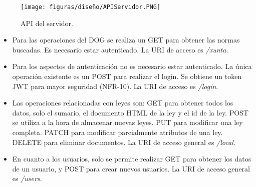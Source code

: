 \begin{figure}[H]
\centerline{\texttt{[image: figuras/diseño/APIServidor.PNG]}}
\caption{API del servidor.}
\label{enlaceAPIServidor}
\end{figure}

\begin{itemize}
    \item Para las operaciones del DOG se realiza un GET para obtener las normas buscadas. Es necesario estar autenticado. La URI de acceso es {\it /xunta}.
    \item Para los aspectos de autenticación no es necesario estar autenticado. La única operación existente es un POST para realizar el login. Se obtiene un token JWT \cite{jwt} para mayor seguridad (NFR-10). La URI de acceso es {\it /login}.
    \item Las operaciones relacionadas con leyes son: GET para obtener todos los datos, solo el sumario, el documento HTML de la ley y el id de la ley. POST se utiliza a la hora de almacenar nuevas leyes. PUT para modificar una ley completa. PATCH para modificar parcialmente atributos de una ley. DELETE para eliminar documentos. La URI de acceso general es {\it /local}.
    \item En cuanto a los usuarios, solo se permite realizar GET para obtener los datos de un usuario, y POST para crear nuevos usuarios. La URI de acceso general es {\it /users}.
\end{itemize}
